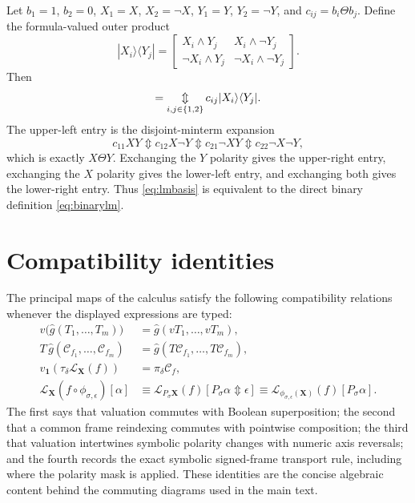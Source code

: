 \documentclass[11pt]{article}
\theoremstyle{definition}
\theoremstyle{remark}
\newcommand{\cC}{\mathcal C}
\newcommand{\xor}{\mathbin{\Updownarrow}}
\newcommand{\bigxor}{\mathop{\Updownarrow}\displaylimits}
\begin{document}
Let $b_1=1$, $b_2=0$, $X_1=X$, $X_2=\neg X$, $Y_1=Y$, $Y_2=\neg Y$, and $c_{ij}=b_i\Theta b_j$.  Define the formula-valued outer product
\[
 |X_i\rangle\langle Y_j|
 =\begin{bmatrix}
 X_i\land Y_j&X_i\land\neg Y_j\\
 \neg X_i\land Y_j&\neg X_i\land\neg Y_j
 \end{bmatrix}.
\]
Then
\begin{equation}
 [M_{X\Theta Y}]=\bigxor_{i,j\in\{1,2\}}
 c_{ij}|X_i\rangle\langle Y_j|.
 \label{eq:lmbasis}
\end{equation}
The upper-left entry is the disjoint-minterm expansion
\[
 c_{11}XY\xor c_{12}X\neg Y\xor c_{21}\neg X Y\xor c_{22}\neg X\neg Y,
\]
which is exactly $X\Theta Y$.  Exchanging the $Y$ polarity gives the upper-right entry, exchanging the $X$ polarity gives the lower-left entry, and exchanging both gives the lower-right entry.  Thus \eqref{eq:lmbasis} is equivalent to the direct binary definition \eqref{eq:binarylm}.

\section{Compatibility identities}

The principal maps of the calculus satisfy the following compatibility relations whenever the displayed expressions are typed:
\begin{align*}
 v\bigl(\widehat g(T_1,\ldots,T_m)\bigr)
 &=\widehat g(vT_1,\ldots,vT_m),\\
 T\,\widehat g(\cC_{f_1},\ldots,\cC_{f_m})
 &=\widehat g(T\cC_{f_1},\ldots,T\cC_{f_m}),\\
 v_{\mathbf1}(\tau_\delta\mathcal L_{\mathbf X}(f))
 &=\pi_\delta\cC_f,\\
 \mathcal L_{\mathbf X}(f\circ\phi_{\sigma,\epsilon})[\alpha]
 &\equiv\mathcal L_{P_\sigma\mathbf X}(f)[P_\sigma\alpha\xor\epsilon]
 \equiv\mathcal L_{\phi_{\sigma,\epsilon}(\mathbf X)}(f)[P_\sigma\alpha].
\end{align*}
The first says that valuation commutes with Boolean superposition; the second that a common frame reindexing commutes with pointwise composition; the third that valuation intertwines symbolic polarity changes with numeric axis reversals; and the fourth records the exact symbolic signed-frame transport rule, including where the polarity mask is applied.  These identities are the concise algebraic content behind the commuting diagrams used in the main text.
\end{document}
